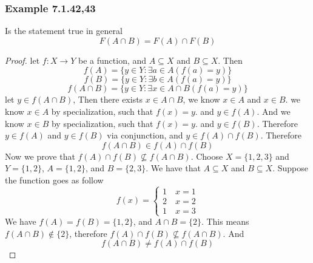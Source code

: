 \documentclass[12pt]{book}
\newcommand{\paren}[1]{\left( #1 \right)}
\begin{document}
\subsubsection{Example 7.1.42,43}
Is the statement true in general
\[
F(A \cap B) = F(A) \cap F(B)
\]
\begin{proof}
    let $f \colon X \to Y$ be a function, and $A \subseteq X$ and $B \subseteq X$.
    Then 
    \[
    f(A) = \{ y \in Y \colon \exists a\in A\paren{f(a) = y}\}
    \]
    \[
    f(B) = \{ y \in Y \colon \exists b\in A\paren{f(a) = y}\}
    \]
    \[
    f(A \cap B) = \{ y \in Y \colon \exists x\in A \cap B \paren{f(a) = y}\}
    \]
    let $y \in f(A\cap B)$, Then there exists $x \in A \cap B$, we know $x \in A$ and $x \in B$. we know $x \in A$ by specialization, such that $f(x) = y$. and $y \in f(A)$. And we know $x \in B$ by specialization, such that $f(x) = y$. and $y \in f(B)$. Therefore $y \in f(A)$ and $y \in f(B)$ via conjunction, and $y \in f(A) \cap f(B)$. Therefore 
    \[
     f(A \cap B) \in f(A)\cap f(B)
    \]
    Now we prove that $f(A)\cap f(B) \not \subseteq f(A\cap B)$. Choose $X = \{1,2,3\}$ and $Y = \{1,2\}$, $A = \{1,2\}$, and $B = \{2,3\}$. We have that $A \subseteq X$ and $B \subseteq X$. Suppose the function goes as follow
    \[
    f(x) = \begin{cases}
        1 \quad x=1\\
        2 \quad x=2\\
        1 \quad x=3
    \end{cases}
    \]
    We have $f(A) = f(B) = \{1,2\}$, and $A \cap B = \{2\}$. This means $f(A \cap B) \notin \{2\}$, therefore $ f(A) \cap f(B) \not \subseteq f(A \cap B)$. And 
    \[
    f(A \cap B) \neq f(A) \cap f(B)
    \]
\end{proof}
\newpage
\end{document}

